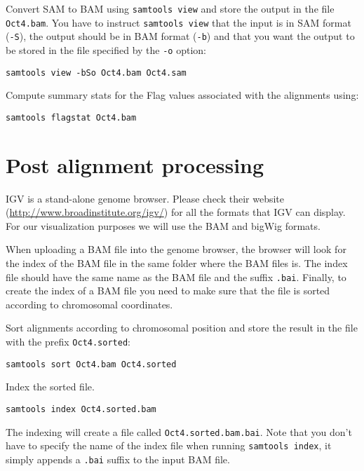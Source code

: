 \begin{steps}
Convert SAM to BAM using \texttt{samtools view} and store the output in the file
\texttt{Oct4.bam}. You have to instruct \texttt{samtools view} that the input is in SAM
format (\texttt{-S}), the output should be in BAM format (\texttt{-b}) and that
you want the output to be stored in the file specified by the \texttt{-o}
option:

\begin{lstlisting}
samtools view -bSo Oct4.bam Oct4.sam
\end{lstlisting}
\end{steps}

\begin{advanced}
Compute summary stats for the Flag values associated with the alignments using:

\begin{lstlisting}
samtools flagstat Oct4.bam
\end{lstlisting}
\end{advanced}

\section{Post alignment processing}

\begin{information}
IGV is a stand-alone genome browser. Please check their website
(\url{http://www.broadinstitute.org/igv/}) for all the formats that IGV
can display. For our visualization purposes we will use the BAM and bigWig
formats.
\end{information}

\begin{note}
When uploading a BAM file into the genome browser, the browser will look for the
index of the BAM file in the same folder where the BAM files is. The index file
should have the same name as the BAM file and the suffix \texttt{.bai}. Finally, to
create the index of a BAM file you need to make sure that the file is sorted
according to chromosomal coordinates.
\end{note}

\begin{steps}
Sort alignments according to chromosomal position and store the result in the
file with the prefix \texttt{Oct4.sorted}:

\begin{lstlisting}
samtools sort Oct4.bam Oct4.sorted
\end{lstlisting}

Index the sorted file.

\begin{lstlisting}
samtools index Oct4.sorted.bam
\end{lstlisting}

The indexing will create a file called \texttt{Oct4.sorted.bam.bai}. Note that
you don't have to specify the name of the index file when running
\texttt{samtools index}, it simply appends a \texttt{.bai} suffix to the input
BAM file.
\end{steps}

